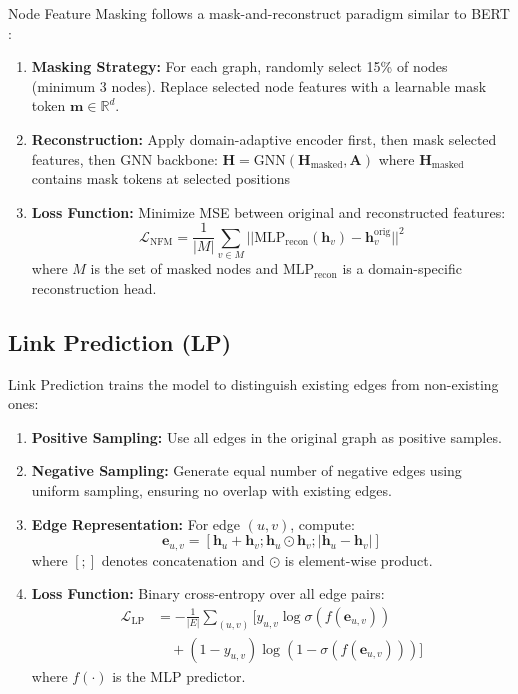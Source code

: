 \documentclass[11pt]{article}
\begin{document}
Node Feature Masking follows a mask-and-reconstruct paradigm similar to BERT \citep{devlin2019bert}:

\begin{enumerate}
\item \textbf{Masking Strategy:} For each graph, randomly select 15\% of nodes (minimum 3 nodes). Replace selected node features with a learnable mask token $\mathbf{m} \in \mathbb{R}^d$.

\item \textbf{Reconstruction:} Apply domain-adaptive encoder first, then mask selected features, then GNN backbone: $\mathbf{H} = \text{GNN}(\mathbf{H}_{\text{masked}}, \mathbf{A})$ where $\mathbf{H}_{\text{masked}}$ contains mask tokens at selected positions

\item \textbf{Loss Function:} Minimize MSE between original and reconstructed features:
\begin{equation*}
\mathcal{L}_{\text{NFM}} = \frac{1}{|M|} \sum_{v \in M} ||\text{MLP}_{\text{recon}}(\mathbf{h}_v) - \mathbf{h}_v^{\text{orig}}||^2
\end{equation*}
where $M$ is the set of masked nodes and $\text{MLP}_{\text{recon}}$ is a domain-specific reconstruction head.
\end{enumerate}

\subsection{Link Prediction (LP)}
\label{sec:lp}

Link Prediction trains the model to distinguish existing edges from non-existing ones:

\begin{enumerate}
\item \textbf{Positive Sampling:} Use all edges in the original graph as positive samples.

\item \textbf{Negative Sampling:} Generate equal number of negative edges using uniform sampling, ensuring no overlap with existing edges.

\item \textbf{Edge Representation:} For edge $(u,v)$, compute:
\begin{equation*}
\mathbf{e}_{u,v} = [\mathbf{h}_u + \mathbf{h}_v; \mathbf{h}_u \odot \mathbf{h}_v; |\mathbf{h}_u - \mathbf{h}_v|]
\end{equation*}
where $[;]$ denotes concatenation and $\odot$ is element-wise product.

\item \textbf{Loss Function:} Binary cross-entropy over all edge pairs:
\begin{align*}
\mathcal{L}_{\text{LP}} &= -\frac{1}{|E|} \sum_{(u,v)} \big[ y_{u,v} \log \sigma(f(\mathbf{e}_{u,v})) \\
&\quad + (1-y_{u,v}) \log(1-\sigma(f(\mathbf{e}_{u,v}))) \big]
\end{align*}
where $f(\cdot)$ is the MLP predictor.
\end{enumerate}
\end{document}
